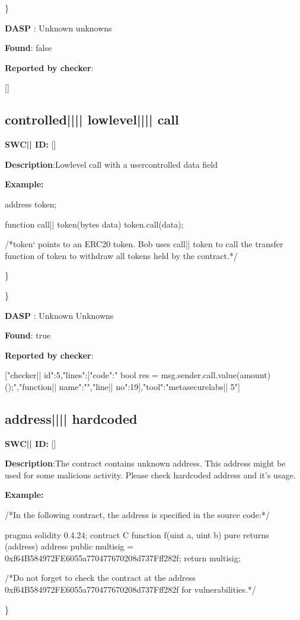 \documentclass{article}
\begin{document}
\} 

\textbf{DASP} : Unknown unknowns

\textbf{Found}: false

\textbf{Reported by checker}: 
\begin{ffcode} 

[]
\end{ffcode} 
\subsection{controlled{||\textunderscore|| }lowlevel{||\textunderscore|| }call} 
\textbf{SWC{|\textunderscore| }ID:} []

\textbf{Description}:Low{\textendash}level call with a user{\textendash}controlled data field


\textbf{Example:} 
\begin{ffcode} 

address token;

function call|\textunderscore| token(bytes data){
  token.call(data);
}

 /*token` points to an ERC20 token. Bob uses call|\textunderscore| token to call the transfer function of token to withdraw all tokens held by the contract.*/ 

\end{ffcode} 
\} 

\} 

\textbf{DASP} : Unknown Unknowns

\textbf{Found}: true

\textbf{Reported by checker}: 
\begin{ffcode} 

[{"checker|\textunderscore| id":5,"lines":[{"code":"      bool res = msg.sender.call.value(amount)();\n","function|\textunderscore| name":"","line|\textunderscore| no":19}],"tool":"metasecurelabs|\textendash| 5"}]
\end{ffcode} 
\subsection{address{||\textunderscore|| }hardcoded} 
\textbf{SWC{|\textunderscore| }ID:} []

\textbf{Description}:The contract contains unknown address. This address might be used for some malicious activity. Please check hardcoded address and it's usage.


\textbf{Example:} 
\begin{ffcode} 

/*In the following contract, the address is specified in the source code:*/ 

pragma solidity 0.4.24;
contract C {
  function f(uint a, uint b) pure returns (address) {
    address public multisig = 0xf64B584972FE6055a770477670208d737Fff282f;
    return multisig;
        }
}

 /*Do not forget to check the contract at the address 0xf64B584972FE6055a770477670208d737Fff282f for vulnerabilities.*/ 

\end{ffcode} 
\} 
\end{document}

